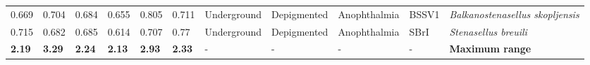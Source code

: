\begin{tabular}{lllllllllll}
          0.669 &           0.704 &           0.684 &           0.655 &           0.805 &           0.711 &  Underground &  Depigmented &     Anophthalmia &    BSSV1 &  \textit{Balkanostenasellus skopljensis} \\
          0.715 &           0.682 &           0.685 &           0.614 &           0.707 &            0.77 &  Underground &  Depigmented &     Anophthalmia &     SBrI &             \textit{Stenasellus breuili} \\
 \textbf{ 2.19} &  \textbf{ 3.29} &  \textbf{ 2.24} &  \textbf{ 2.13} &  \textbf{ 2.93} &  \textbf{ 2.33} &            - &            - &                - &        - &                   \textbf{Maximum range} \\
\bottomrule
\end{tabular}
